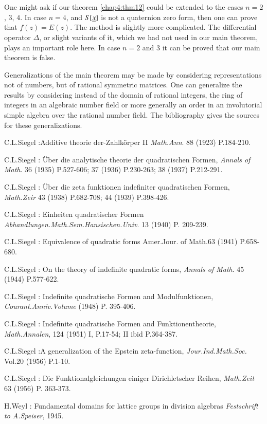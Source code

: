 One might ask if our theorem \ref{chap4:thm12} could be extended to the
cases $n=2$, $3$, $4$. In case $n=4$, and $S[\underline{x}]$ is not a
quaternion zero form, then one can prove that $f(z)=E(z)$. The method
is slightly more complicated. The differential operator $\Delta$, or
slight variants of it, which we had not used in our main theorem,
plays an important role here. In case $n=2$ and $3$ it can be proved
that our main theorem is false.

Generalizations of the main theorem may be made by considering
representations not of numbers, but of rational symmetric
matrices. One can generalize the results by considering instead of the
domain of rational integers, the ring of integers in an algebraic
number field or more generally an order in an involutorial simple
algebra over the rational number field. The bibliography gives the
sources for these generalizations.


\begin{thebibliography}{99}
 C.\@ L.\@ Siegel :\pageoriginale  Additive theorie
  der-Zahlk\"orper II {\em 
  Math.\@ Ann}. 88 (1923) P.\@ 184-210.

 C.\@ L.\@ Siegel :  \"Uber die analytische theorie der
quadratischen Formen, {\em Annals of Math}. 36 (1935) P.\@ 527-606; 37
(1936) P.\@ 230-263; 38 (1937) P.\@ 212-291.

 C.\@ L.\@ Siegel :  \"Uber die zeta funktionen indefiniter
quadratischen Formen, {\em Math.\@ Zeir} 43 (1938) P.\@ 682-708; 44
(1939) P.\@ 398-426.

 C.\@ L.\@ Siegel :  Einheiten quadratischer Formen {\em
  Abhandlungen.\@ Math.\@ Sem.\@ Hansischen.\@ Univ}. 13 (1940) P.\@
209-239.

 C.\@ L.\@ Siegel : Equivalence of quadratic forms Amer.\@ Jour.\@
of Math.\@ 63 (1941) P.\@ 658-680.

 C.\@ L.\@ Siegel : On the theory of indefinite quadratic forms,
{\em Annals of Math}. 45 (1944) P.\@ 577-622.

 C.\@ L.\@ Siegel : Indefinite quadratische Formen and
Modulfunktionen, {\em Courant.\@ Anniv.\@ Volume} (1948) P.\@
395-406.

 C.\@ L.\@ Siegel : Indefinite quadratische Formen and
Funktionentheorie, {\em Math.\@ Annalen}, 124 (1951) I, P.\@ 17-54; II
ibid P.\@ 364-387.

 C.\@ L.\@ Siegel :\pageoriginale A generalization of
  the Epstein zeta-function, 
{\em Jour.\@ Ind.\@ Math.\@ Soc.\@} Vol.\@ 20 (1956) P.\@ 1-10.

 C.\@ L.\@ Siegel : Die Funktionalgleichungen einiger
Dirichletscher Reihen, {\em Math.\@ Zeit} 63 (1956) P.\@
363-373.

 H.\@ Weyl : Fundamental domains for lattice groups
  in division algebras {\em Festschrift to A.\@ Speiser}, 1945.
\end{thebibliography}
